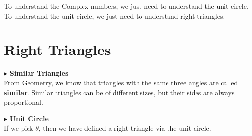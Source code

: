 \documentclass{ximera}
\begin{document}
To understand the Complex numbers, we just need to understand the unit circle.  To understand the unit circle, we just need to understand right triangles.







\section{Right Triangles}




$\blacktriangleright$ \textbf{\textcolor{blue!75!black}{Similar Triangles}}  \\

From Geometry, we know that triangles with the same three angles are called \textbf{similar}.  Similar triangles can be of different sizes, but their sides are always proportional.







$\blacktriangleright$ \textbf{\textcolor{blue!75!black}{Unit Circle}}  \\




If we pick $\theta$, then we have defined a right triangle via the unit circle.
\end{document}
